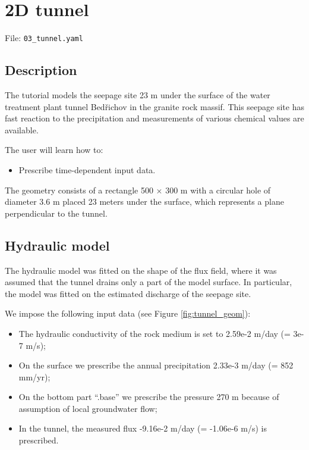 \section{2D tunnel}

File: \texttt{03\_tunnel.yaml}

\subsection{Description}

The tutorial models the seepage site 23 m under the surface of the water
treatment plant tunnel Bedřichov in the granite rock massif. This
seepage site has fast reaction to the precipitation and measurements of
various chemical values are available.

The user will learn how to:

\begin{itemize}
\tightlist
\item
  Prescribe time-dependent input data.
\end{itemize}

The geometry consists of a rectangle 500 × 300 m with a circular hole of
diameter 3.6 m placed 23 meters under the surface, which represents a
plane perpendicular to the tunnel.

\subsection{Hydraulic model}

The hydraulic model was fitted on the shape of the flux field, where it
was assumed that the tunnel drains only a part of the model surface. In
particular, the model was fitted on the estimated discharge of the
seepage site.

We impose the following input data (see Figure \ref{fig:tunnel_geom}):

\begin{itemize}
\tightlist
\item
  The hydraulic conductivity of the rock medium is set to 2.59e-2 m/day
  (= 3e-7 m/s);
\item
  On the surface we prescribe the annual precipitation 2.33e-3 m/day (=
  852 mm/yr);
\item
  On the bottom part ``.base'' we prescribe the pressure 270 m because
  of assumption of local groundwater flow;
\item
  In the tunnel, the measured flux -9.16e-2 m/day (= -1.06e-6 m/s) is
  prescribed.
\end{itemize}

